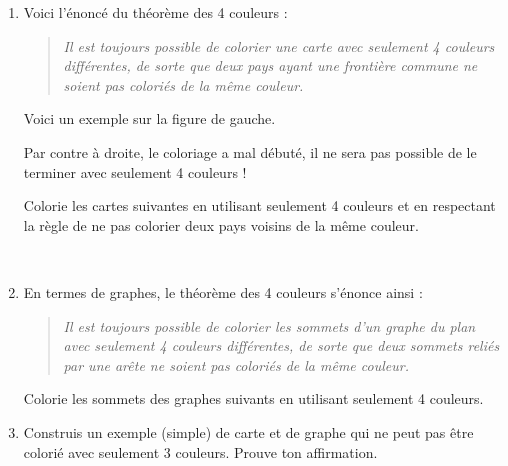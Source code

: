 \documentclass[class=report,crop=false, 12pt]{standalone}
\begin{document}
\begin{activite}
\begin{enumerate}
 
  \item Voici l'énoncé du théorème des 4 couleurs : 
  \begin{quote}
  \emph{Il est toujours possible de colorier une carte avec seulement 4 couleurs différentes, de sorte que deux pays ayant une frontière commune ne soient pas coloriés de la même couleur.}
  \end{quote}
  
  Voici un exemple sur la figure de gauche. 

  Par contre à droite, le coloriage a mal débuté, il ne sera pas possible de le terminer avec seulement 4 couleurs !
  
  
  Colorie les cartes suivantes en utilisant seulement 4 couleurs et en respectant la règle de ne pas colorier deux pays voisins de la même couleur.
  

 ~
 
  
  
  \item En termes de graphes, le théorème des 4 couleurs s'énonce ainsi : 
  \begin{quote}
  \emph{Il est toujours possible de colorier les sommets d'un graphe du plan avec seulement 4 couleurs différentes, de sorte que deux sommets reliés par une arête ne soient pas coloriés de la même couleur.}
  \end{quote}    
 
  Colorie les sommets des graphes suivants en utilisant seulement 4 couleurs.
  
  \item Construis un exemple (simple) de carte et de graphe qui ne peut pas être colorié avec seulement 3 couleurs. Prouve ton affirmation.
\end{enumerate}
    

   
\end{activite}
\end{document}
